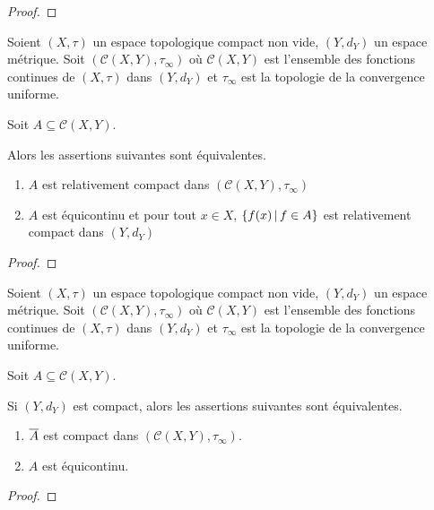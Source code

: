 \ifdefined\outputproof
\begin{proof}

\end{proof}
\fi

\begin{theorem} 
	Soient $(X, \tau)$ un espace topologique compact non vide, $(Y, d_{Y})$ un
	espace métrique. Soit $(\mathcal{C}(X, Y), \tau_{\infty})$ où
	$\mathcal{C}(X, Y)$ est l'ensemble des fonctions continues de $(X, \tau)$
	dans $(Y, d_{Y})$ et $\tau_{\infty}$ est la topologie de la convergence uniforme.

	Soit $A \subseteq \mathcal{C}(X, Y)$.

	Alors les assertions suivantes sont équivalentes.
	\begin{enumerate}
		\item $A$ est relativement compact dans $(\mathcal{C}(X, Y),
			\tau_{\infty})$
		\item $A$ est équicontinu et pour tout $x \in X$, $\left\{f(x) \, | \, f \in
			A \right\}$ est relativement compact dans $(Y, d_{Y})$
	\end{enumerate}
\end{theorem}

\ifdefined\outputproof
\begin{proof}

\end{proof}
\fi

\begin{corollary}
	Soient $(X, \tau)$ un espace topologique compact non vide, $(Y, d_{Y})$ un
	espace métrique. Soit $(\mathcal{C}(X, Y), \tau_{\infty})$ où
	$\mathcal{C}(X, Y)$ est l'ensemble des fonctions continues de $(X, \tau)$
	dans $(Y, d_{Y})$ et $\tau_{\infty}$ est la topologie de la convergence uniforme.

	Soit $A \subseteq \mathcal{C}(X, Y)$.

	Si $(Y, d_{Y})$ est compact, alors les assertions suivantes sont
	équivalentes.

	\begin{enumerate}
		\item $\overline{A}$ est compact dans $(\mathcal{C}(X, Y), \tau_{\infty})$.
		\item $A$ est équicontinu.
	\end{enumerate}
\end{corollary}

\ifdefined\outputproof
\begin{proof}

\end{proof}
\fi

